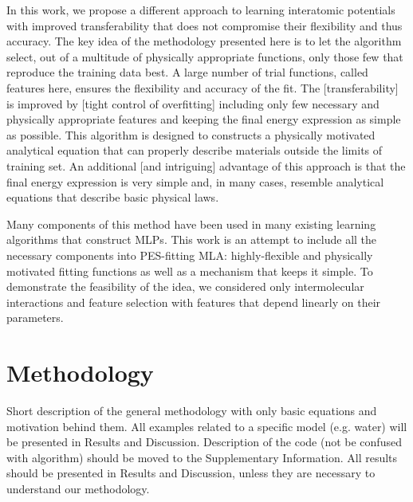 \documentclass[aps,prl,reprint,amsmath,amssymb,nature]{revtex4-1}
\begin{document}
In this work, we propose a different approach to learning interatomic potentials with improved transferability that does not compromise their flexibility and thus accuracy. 
The key idea of the methodology presented here is to let the algorithm select, out of a multitude of physically appropriate functions, only those few that reproduce the training data best. 
A large number of trial functions, called features here, ensures the flexibility and accuracy of the fit. 
The [transferability] is improved by [tight control of overfitting] including only few necessary and physically appropriate features and keeping the final energy expression as simple as possible. 
This algorithm is designed to constructs a physically motivated analytical equation that can properly describe materials outside the limits of training set. 
An additional [and intriguing] advantage of this approach is that the final energy expression is very simple and, in many cases, resemble analytical equations that describe basic physical laws.

Many components of this method have been used in many existing learning algorithms that construct MLPs. 
This work is an attempt to include all the necessary components into PES-fitting MLA: highly-flexible and physically motivated fitting functions as well as a mechanism that keeps it simple. 
To demonstrate the feasibility of the idea, we considered only intermolecular interactions and feature selection with features that depend linearly on their parameters.



\section{Methodology}

\red Short description of the general methodology with only basic equations and motivation behind them. All examples related to a specific model (e.g. water) will be presented in Results and Discussion. Description of the code (not be confused with algorithm) should be moved to the Supplementary Information. All results should be presented in Results and Discussion, unless they are necessary to understand our methodology. \old
\end{document}
